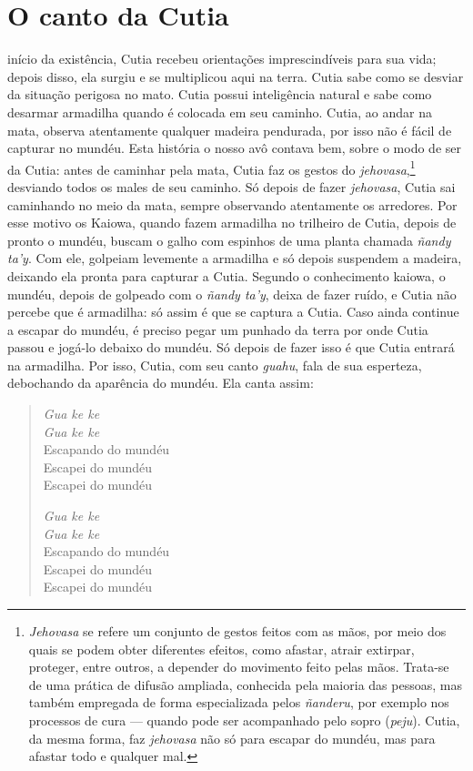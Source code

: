 \chapter{O canto da Cutia}

 início da existência, Cutia recebeu orientações imprescindíveis para
sua vida; depois disso, ela surgiu e se multiplicou aqui na terra. Cutia
sabe como se desviar da situação perigosa no mato. Cutia possui
inteligência natural e sabe como desarmar armadilha quando é colocada em
seu caminho. Cutia, ao andar na mata, observa atentamente qualquer
madeira pendurada, por isso não é fácil de capturar no mundéu. Esta
história o nosso avô contava bem, sobre o modo de ser da Cutia: antes de
caminhar pela mata, Cutia faz os gestos do \textit{jehovasa},\footnote{\textit{Jehovasa}
  se refere um conjunto de gestos feitos com as mãos, por meio dos quais
  se podem obter diferentes efeitos, como afastar, atrair extirpar,
  proteger, entre outros, a depender do movimento feito pelas mãos.
  Trata-se de uma prática de difusão ampliada, conhecida pela maioria
  das pessoas, mas também empregada de forma especializada pelos
  \textit{ñanderu}, por exemplo nos processos de cura --- quando pode ser
  acompanhado pelo sopro (\textit{peju}). Cutia, da mesma forma, faz
  \textit{jehovasa} não só para escapar do mundéu, mas para afastar todo e
  qualquer mal.} desviando todos os males de seu caminho. Só depois de
fazer \textit{jehovasa}, Cutia sai caminhando no meio da mata, sempre
observando atentamente os arredores. Por esse motivo os Kaiowa, quando
fazem armadilha no trilheiro de Cutia, depois de pronto o mundéu, buscam
o galho com espinhos de uma planta chamada \textit{ñandy ta’y}. Com ele,
golpeiam levemente a armadilha e só depois suspendem a madeira, deixando
ela pronta para capturar a Cutia. Segundo o conhecimento kaiowa, o
mundéu, depois de golpeado com o \textit{ñandy ta’y}, deixa de fazer ruído,
e Cutia não percebe que é armadilha: só assim é que se captura a Cutia. Caso ainda continue a escapar do mundéu, é preciso pegar um punhado da terra por onde Cutia passou e jogá-lo debaixo do mundéu. Só depois de fazer isso é que Cutia entrará na armadilha. Por isso, Cutia, com seu canto \textit{guahu}, fala de sua esperteza,
debochando da aparência do mundéu. Ela canta assim:

\begin{verse}
\textit{Gua ke ke}\\
\textit{Gua ke ke}\\
Escapando do mundéu\\
Escapei do mundéu\\
Escapei do mundéu

\textit{Gua ke ke}\\
\textit{Gua ke ke}\\
Escapando do mundéu\\
Escapei do mundéu\\
Escapei do mundéu  
\end{verse}

